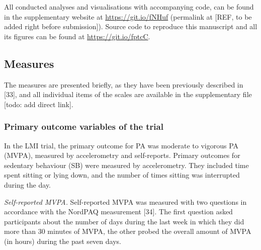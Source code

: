 \documentclass[english,man,floatsintext]{apa6}
\begin{document}
All conducted analyses and visualisations with accompanying code, can be found in the supplementary website at \url{https://git.io/fNHuf} (permalink at {[}REF, to be added right before submission{]}). Source code to reproduce this manuscript and all its figures can be found at \url{https://git.io/fptcC}.

\hypertarget{measures}{%
\subsection{Measures}\label{measures}}

The measures are presented briefly, as they have been previously described in {[}33{]}, and all individual items of the scales are available in the supplementary file {[}todo: add direct link{]}.

\hypertarget{primary-outcome-variables-of-the-trial}{%
\subsubsection{Primary outcome variables of the trial}\label{primary-outcome-variables-of-the-trial}}

In the LMI trial, the primary outcome for PA was moderate to vigorous PA (MVPA), measured by accelerometry and self-reports. Primary outcomes for sedentary behaviour (SB) were measured by accelerometry. They included time spent sitting or lying down, and the number of times sitting was interrupted during the day.

\emph{Self-reported MVPA.} Self-reported MVPA was measured with two questions in accordance with the NordPAQ measurement {[}34{]}. The first question asked participants about the number of days during the last week in which they did more than 30 minutes of MVPA, the other probed the overall amount of MVPA (in hours) during the past seven days.
\end{document}
